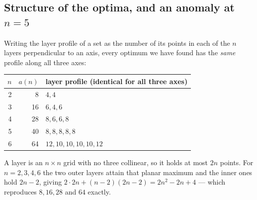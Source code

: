 \documentclass[11pt,a4paper]{article}
\begin{document}
\subsection{Structure of the optima, and an anomaly at \texorpdfstring{$n=5$}{n=5}}\label{s:layers}
Writing the layer profile of a set as the number of its points in each of the $n$ layers perpendicular to an
axis, every optimum we have found has the \emph{same} profile along all three axes:
\begin{center}\begin{tabular}{rrl}\toprule
$n$ & $a(n)$ & layer profile (identical for all three axes)\\\midrule
2 & 8  & $4,4$\\
3 & 16 & $6,4,6$\\
4 & 28 & $8,6,6,8$\\
5 & 40 & $8,8,8,8,8$\\
6 & 64 & $12,10,10,10,10,12$\\\bottomrule
\end{tabular}\end{center}
A layer is an $n\times n$ grid with no three collinear, so it holds at most $2n$ points.  For $n=2,3,4,6$ the two
outer layers attain that planar maximum and the inner ones hold $2n-2$, giving $2\cdot 2n+(n-2)(2n-2)=2n^2-2n+4$
--- which reproduces $8,16,28$ and $64$ exactly.
\end{document}
